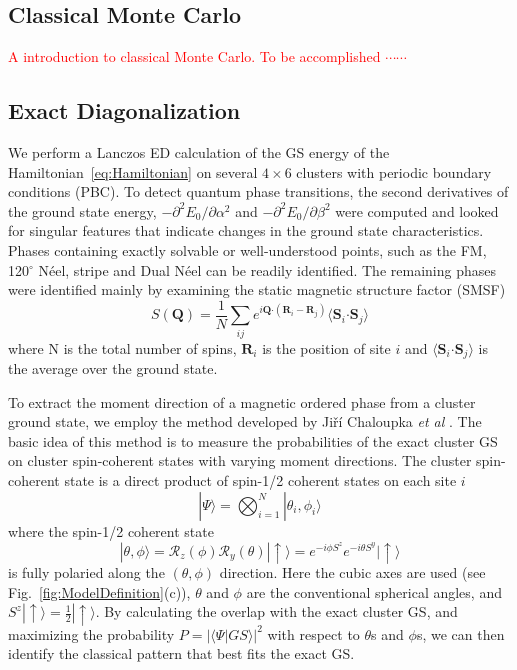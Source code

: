 \documentclass[aps,prb,reprint,amsfonts,amsmath,amssymb,showpacs,groupedaddress,superscriptaddress]{revtex4-1}
\begin{document}
\subsection{\label{sec:SectionIIA}Classical Monte Carlo}
\textcolor{red}{A introduction to classical Monte Carlo. To be accomplished $\cdots \cdots$}

\subsection{\label{sec:SectionIIB}Exact Diagonalization}
We perform a Lanczos ED calculation of the GS energy of the Hamiltonian~\eqref{eq:Hamiltonian} on several $4 \times 6$ clusters with periodic boundary conditions (PBC). To detect quantum phase transitions, the second derivatives of the ground state energy, $-\partial^2E_0/\partial\alpha^2$ and $-\partial^2E_0/\partial\beta^2$ were computed and looked for singular features that indicate changes in the ground state characteristics. Phases containing exactly solvable or well-understood points, such as the FM, 120$^\circ$ N\'{e}el, stripe and Dual N\'{e}el can be readily identified. The remaining phases were identified mainly by examining the static magnetic structure factor (SMSF)
\begin{equation}
    S(\bm{Q}) = \frac{1}{N} \sum_{ij} e^{i \bm{Q} \bm{\cdot} (\bm{R}_i - \bm{R}_j)} \langle \bm{S}_i \bm{\cdot} \bm{S}_j \rangle \label{eq:SMSF}
\end{equation}
where N is the total number of spins, $\bm{R}_i$ is the position of site $i$ and $\langle \bm{S}_i \bm{\cdot} \bm{S}_j \rangle$ is the average over the ground state.

To extract the moment direction of a magnetic ordered phase from a cluster ground state, we employ the method developed by Ji\v{r}\'{i} Chaloupka \emph{et  al} \cite{PhysRevB.94.064435}. The basic idea of this method is to measure the probabilities of the exact cluster GS on cluster spin-coherent states with varying moment directions. The cluster spin-coherent state is a direct product of spin-1/2 coherent states on each site $i$
\begin{equation}
    | \Psi \rangle = \bigotimes_{i=1}^N | \theta_i, \phi_i \rangle \label{eq:ClusterCoherentState}
\end{equation}
where the spin-1/2 coherent state
\begin{equation}
    | \theta, \phi \rangle = \mathcal{R}_z(\phi) \mathcal{R}_y(\theta) | \uparrow \rangle = e^{-i \phi S^z} e^{-i \theta S^y} | \uparrow \rangle \label{eq:Spin-1/2CoherentState}
\end{equation}
is fully polaried along the $(\theta, \phi)$ direction. Here the cubic axes are used (see Fig.~\ref{fig:ModelDefinition}(c)), $\theta$ and $\phi$ are the conventional spherical angles, and $S^z | \uparrow \rangle = \frac{1}{2} | \uparrow \rangle$. By calculating the overlap with the exact cluster GS, and maximizing the probability $P = | \langle \Psi | GS \rangle|^2$ with respect to $\theta$s and $\phi$s, we can then identify the classical pattern that best fits the exact GS.
\end{document}
